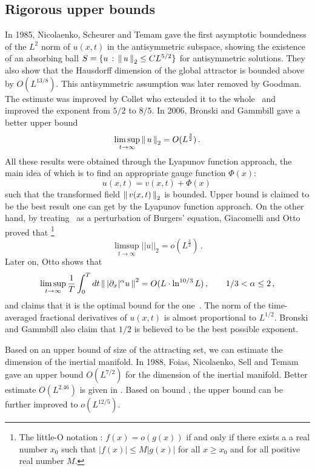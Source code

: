 \subsection{Rigorous upper bounds}

In 1985, Nicolaenko, Scheurer and Temam gave the first asymptotic
boundedness of the $L^2$ norm of $u(x,t)$ in the antisymmetric subspace,
showing the existence of  an absorbing ball
$S = \{u\,:\, \left\Arrowvert \, u \, \right\Arrowvert_{2} \le C L^{5/2}\}$
for antisymmetric solutions. They also show that the Hausdorff dimension of the
global attractor is bounded above by $O(L^{13/8})$.
This antisymmetric assumption was later removed by
Goodman.
The estimate was improved by Collet \etal{}
who extended it to the whole \statesp\ and improved the
exponent from $5/2$ to $8/5$.
In 2006, Bronski and Gammbill gave a better upper bound
\begin{equation}
  \label{eq:ksbound1}
  \limsup_{t\to\infty}\left\Arrowvert \, u \, \right\Arrowvert_2 = O(L^{\frac{3}{2}})
  \,.
\end{equation}
All these results were obtained through the Lyapunov function approach,
the main idea of which is to find an appropriate gauge function $\Phi(x)$:
\begin{equation}
  \label{eq:gauge}
  u(x, t) = v(x,t) + \Phi(x)
  \,
\end{equation}
such that the transformed field $\left\Arrowvert \, v(x, t) \, \right\Arrowvert_{2}$ is bounded.
Upper bound  is claimed to be
the best result one can get by the Lyapunov function approach.
On the other hand, by treating \KSe\ as a perturbation of Burgers' equation,
Giacomelli and Otto proved that
\footnote{
  The little-O notation :
  $f(x) = o(g(x))$ if and only if there exists a
  a real number $x_0$ such that $|f(x)| \le M |g(x)|$ for all $x \ge x_0$ and
  for all positive real number $M$.
}
\begin{equation}
  \label{eq:ksbound2}
  \limsup_{t\to\infty}|\!|u|\!|_2 = o(L^{\frac{3}{2}})
  \,.
\end{equation}
Later on, Otto shows that
\[
  \limsup_{t\to\infty} \frac{1}{T}\int_0^T dt \left\Arrowvert \, |\partial_x|^\alpha u \, \right\Arrowvert^2
  = O(L\cdot\ln^{10/3} L)
  \,,\qquad 1/3 < \alpha \le 2
  \,,
\]
and claims that it is the optimal bound for the one\dmn\ \KSe.
The norm of the
time-averaged fractional derivatives of $u(x,t)$ is almost
proportional to $L^{1/2}$. Bronski and Gammbill
also claim that $1/2$ is believed to be the best possible exponent.

Based on an upper bound of size of the attracting set, we can estimate
the dimension of the inertial manifold.
In 1988, Foias, Nicolaenko, Sell and Temam gave an upper bound
$O(L^{7/2})$ for the dimension of the inertial manifold.
Better estimate $O(L^{2.46})$ is given in .
Based on bound , the upper bound can be further
improved to $o(L^{12/5})$.


